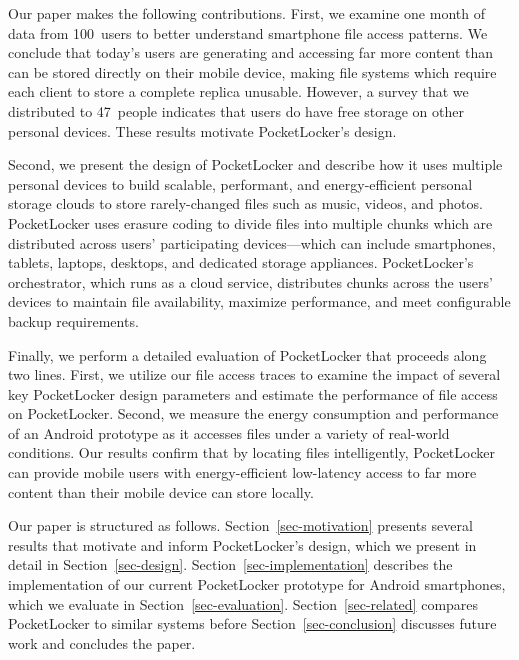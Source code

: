 Our paper makes the following contributions. First, we examine one month of
data from 100~users to better understand smartphone file access patterns. We
conclude that today's users are generating and accessing far more content
than can be stored directly on their mobile device, making file systems which
require each client to store a complete replica unusable. However, a survey
that we distributed to 47~people indicates that users do have free storage on
other personal devices. These results motivate PocketLocker's design.

Second, we present the design of PocketLocker and describe how it uses
multiple personal devices to build scalable, performant, and energy-efficient
personal storage clouds to store rarely-changed files such as music, videos,
and photos. PocketLocker uses erasure coding to divide files into multiple
chunks which are distributed across users' participating devices---which
can include smartphones, tablets, laptops, desktops, and dedicated storage
appliances. PocketLocker’s orchestrator, which runs as a cloud service,
distributes chunks across the users’ devices to maintain file
availability, maximize performance, and meet configurable backup
requirements.

Finally, we perform a detailed evaluation of PocketLocker that proceeds along
two lines. First, we utilize our file access traces to examine the impact of
several key PocketLocker design parameters and estimate the performance of
file access on PocketLocker. Second, we measure the energy consumption and
performance of an Android prototype as it accesses files under a variety of
real-world conditions. Our results confirm that by locating files
intelligently, PocketLocker can provide mobile users with energy-efficient
low-latency access to far more content than their mobile device can store
locally.

Our paper is structured as follows. Section~\ref{sec-motivation} presents
several results that motivate and inform PocketLocker's design, which we
present in detail in Section~\ref{sec-design}.
Section~\ref{sec-implementation} describes the implementation of our
current PocketLocker prototype for Android smartphones, which we evaluate in
Section~\ref{sec-evaluation}. Section~\ref{sec-related} compares PocketLocker
to similar systems before Section~\ref{sec-conclusion} discusses future work
and concludes the paper.
